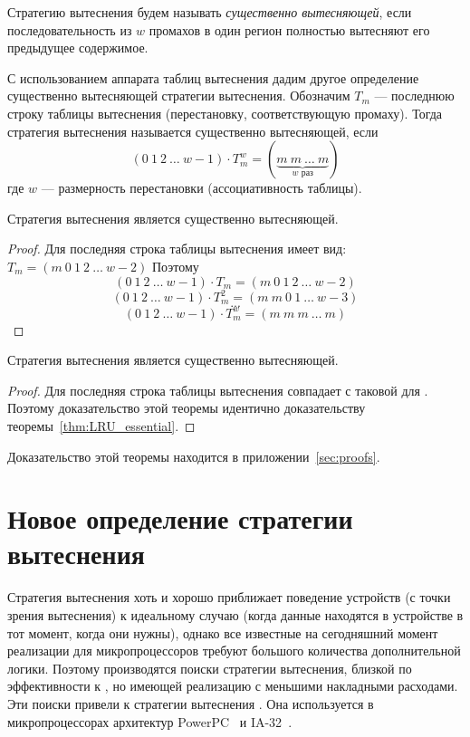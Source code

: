 Стратегию вытеснения будем называть \emph{существенно вытесняющей}, если последовательность из $w$ промахов в один регион полностью вытесняют его предыдущее содержимое.

С использованием аппарата таблиц вытеснения дадим другое определение существенно вытесняющей стратегии вытеснения. Обозначим $T_m$ --- последнюю строку таблицы вытеснения (перестановку, соответствующую промаху). Тогда стратегия вытеснения называется существенно вытесняющей, если $$(0~1~2~\dots~w{-}1) \cdot T_m^w = (\underbrace{m~m~\dots~m}_{\mbox{$w$~раз}})$$ где $w$ --- размерность перестановки (ассоциативность таблицы).

\begin{theorem}\label{thm:LRU_essential}
  Стратегия вытеснения \LRU является существенно вытесняющей.
\end{theorem}
\begin{proof}
  Для \LRU последняя строка таблицы вытеснения имеет вид: $T_m = (m~0~1~2~\dots~w{-}2)$ Поэтому
  $$(0~1~2~\dots~w{-}1) \cdot T_m = (m~0~1~2~\dots~w{-}2)$$
  $$(0~1~2~\dots~w{-}1) \cdot T_m^2 = (m~m~0~1~\dots~w{-}3)$$
  $$\mbox{...}$$
  $$(0~1~2~\dots~w{-}1) \cdot T_m^w = (m~m~m~\dots~m)$$
\end{proof}

\begin{theorem}
  Стратегия вытеснения \FIFO является существенно вытесняющей.
\end{theorem}
\begin{proof}
  Для \FIFO последняя строка таблицы вытеснения совпадает с таковой для \LRU. Поэтому доказательство этой теоремы идентично доказательству теоремы~\ref{thm:LRU_essential}.
\end{proof}

\begin{theorem}\label{thm:PseudoLRU_essential} \PseudoLRUEssential \end{theorem}

Доказательство этой теоремы находится в приложении~\ref{sec:proofs}.



\section{Новое определение стратегии вытеснения\\ \PseudoLRU}\label{sec:plru_new_definition}

Стратегия вытеснения \LRU хоть и хорошо приближает поведение устройств (с точки зрения вытеснения) к идеальному случаю (когда данные находятся в устройстве в тот момент, когда они нужны), однако все известные на сегодняшний момент реализации \LRU для микропроцессоров требуют большого количества дополнительной логики. Поэтому производятся поиски стратегии вытеснения, близкой по эффективности к \LRU, но имеющей реализацию с меньшими накладными расходами. Эти поиски привели к стратегии вытеснения \PseudoLRU. Она используется в микропроцессорах архитектур PowerPC~\cite{PowerPC} и IA-32~\cite{FundamentalOfComputerOrganizationAndDesign}.

